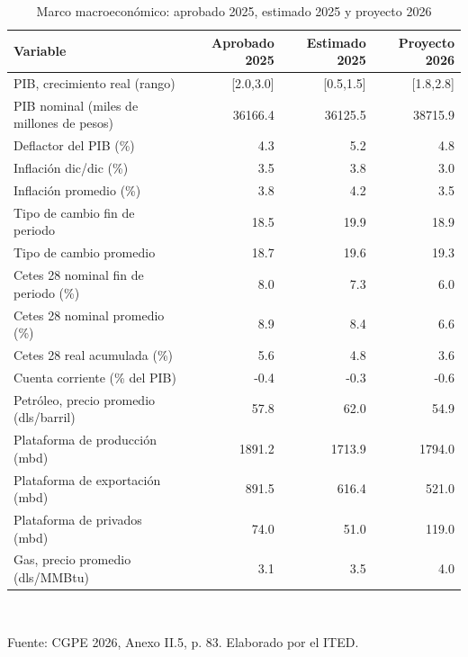 \begin{table}[htbp]
\centering
\scriptsize
\caption{Marco macroeconómico: aprobado 2025, estimado 2025 y proyecto 2026}
\label{cua:C1_1}
\begin{tabular}{lrrr}
\toprule
\textbf{Variable} & \textbf{Aprobado 2025} & \textbf{Estimado 2025} & \textbf{Proyecto 2026} \\
\midrule
PIB, crecimiento real (rango) & [2.0,3.0] & [0.5,1.5] & [1.8,2.8] \\
PIB nominal (miles de millones de pesos) & 36166.4 & 36125.5 & 38715.9 \\
Deflactor del PIB (\%) & 4.3 & 5.2 & 4.8 \\
Inflación dic/dic (\%) & 3.5 & 3.8 & 3.0 \\
Inflación promedio (\%) & 3.8 & 4.2 & 3.5 \\
Tipo de cambio fin de periodo & 18.5 & 19.9 & 18.9 \\
Tipo de cambio promedio & 18.7 & 19.6 & 19.3 \\
Cetes 28 nominal fin de periodo (\%) & 8.0 & 7.3 & 6.0 \\
Cetes 28 nominal promedio (\%) & 8.9 & 8.4 & 6.6 \\
Cetes 28 real acumulada (\%) & 5.6 & 4.8 & 3.6 \\
Cuenta corriente (\% del PIB) & -0.4 & -0.3 & -0.6 \\
Petróleo, precio promedio (dls/barril) & 57.8 & 62.0 & 54.9 \\
Plataforma de producción (mbd) & 1891.2 & 1713.9 & 1794.0 \\
Plataforma de exportación (mbd) & 891.5 & 616.4 & 521.0 \\
Plataforma de privados (mbd) & 74.0 & 51.0 & 119.0 \\
Gas, precio promedio (dls/MMBtu) & 3.1 & 3.5 & 4.0 \\
\bottomrule
\end{tabular}
\\[2pt]\begin{minipage}{0.92\textwidth}\scriptsize Fuente: CGPE 2026, Anexo II.5, p. 83. Elaborado por el ITED.\end{minipage}
\end{table}
